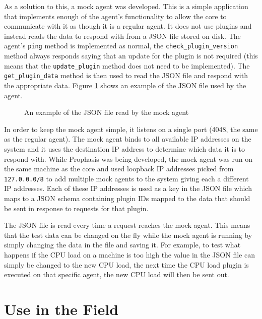 \documentclass[bsc,logo,twoside,parskip,singlespacing,notimes]{infthesis}
\begin{document}
	As a solution to this, a mock agent was developed.  This is a simple application
	that implements enough of the agent's functionality to allow the core to
	communicate with it as though it is a regular agent.  It does not use plugins
	and instead reads the data to respond with from a JSON file stored on disk. The
	agent's \texttt{ping} method is implemented as normal, the
	\texttt{check\_plugin\_version} method always responds saying that an update for
	the plugin is not required (this means that the \texttt{update\_plugin} method does
	not need to be implemented).  The \texttt{get\_plugin\_data} method is then
	used to read the JSON file and respond with the appropriate data. Figure
	\ref{mock-agent-data} shows an example of the JSON file used by the agent.

\begin{figure}[H]
	\caption{An example of the JSON file read by the mock agent}
	\label{mock-agent-data}
	
\end{figure}


	In order to keep the mock agent simple, it listens on a single port (4048, the
	same as the regular agent).  The mock agent binds to all available IP addresses
	on the system and it uses the destination IP address to determine which data it
	is to respond with.  While Prophasis was being developed, the mock agent was
	run on the same machine
	as the core and used loopback IP addresses picked from \texttt{127.0.0.0/8} to
	add multiple mock agents to the system giving each a different IP addresses.
	Each of these IP addresses is used as a key in the JSON file which maps to a
	JSON schema containing plugin IDs mapped to the data that should be sent in
	response to requests for that plugin.


	The JSON file is read every time a request reaches the mock agent.  This means
	that the test data can be changed on the fly while the mock agent is running by
	simply changing the data in the file and saving it.  For example, to test what
	happens if the CPU load on a machine is too high the value in the JSON file can
	simply be changed to the new CPU load, the next time the CPU
	load plugin is executed on that specific agent, the new CPU load will then be
	sent out.

\section{Use in the Field}
\end{document}
